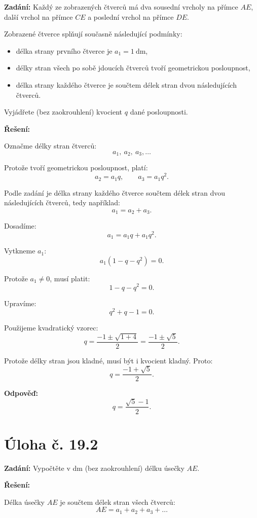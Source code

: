 \documentclass[12pt,a4paper]{article}
\begin{document}
\textbf{Zadání:}  
Každý ze zobrazených čtverců má dva sousední vrcholy na přímce \(AE\), další vrchol na přímce \(CE\) a poslední vrchol na přímce \(DE\).

Zobrazené čtverce splňují současně následující podmínky:
\begin{itemize}
    \item délka strany prvního čtverce je \(a_1=1\ \mathrm{dm}\),
    \item délky stran všech po sobě jdoucích čtverců tvoří geometrickou posloupnost,
    \item délka strany každého čtverce je součtem délek stran dvou následujících čtverců.
\end{itemize}

Vyjádřete (bez zaokrouhlení) kvocient \(q\) dané posloupnosti.

\bigskip

\textbf{Řešení:}

Označme délky stran čtverců:
\[
a_1,\ a_2,\ a_3,\dots
\]

Protože tvoří geometrickou posloupnost, platí:
\[
a_2=a_1q,\qquad a_3=a_1q^2.
\]

Podle zadání je délka strany každého čtverce součtem délek stran dvou následujících čtverců, tedy například:
\[
a_1=a_2+a_3.
\]

Dosadíme:
\[
a_1=a_1q+a_1q^2.
\]

Vytkneme \(a_1\):
\[
a_1(1-q-q^2)=0.
\]

Protože \(a_1\neq 0\), musí platit:
\[
1-q-q^2=0.
\]

Upravíme:
\[
q^2+q-1=0.
\]

Použijeme kvadratický vzorec:
\[
q=\frac{-1\pm\sqrt{1+4}}{2}=\frac{-1\pm\sqrt{5}}{2}.
\]

Protože délky stran jsou kladné, musí být i kvocient kladný. Proto:
\[
q=\frac{-1+\sqrt{5}}{2}.
\]

\bigskip

\textbf{Odpověď:}  
\[
q=\frac{\sqrt{5}-1}{2}.
\]


\section*{Úloha č. 19.2}

\textbf{Zadání:}  
Vypočtěte v dm (bez zaokrouhlení) délku úsečky \(AE\).

\bigskip

\textbf{Řešení:}

Délka úsečky \(AE\) je součtem délek stran všech čtverců:
\[
AE=a_1+a_2+a_3+\dots
\]
\end{document}
